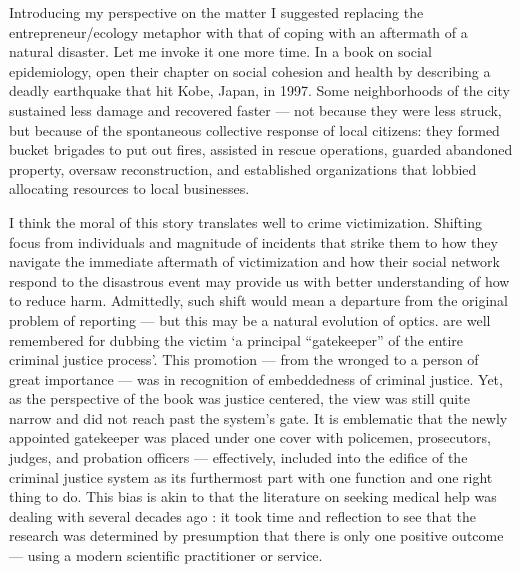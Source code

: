 \documentclass[]{interact}
\theoremstyle{plain}%
\theoremstyle{definition}
\theoremstyle{remark}
\newcommand\citep{\parencite}
\newcommand\citet{\textcite}
\begin{document}
	Introducing my perspective on the matter I suggested replacing the entrepreneur/ecology metaphor with that of coping with an aftermath of a natural disaster. 
	Let me invoke it one more time. In a book on social epidemiology, \citet{kawachi2014social} open their chapter on social cohesion and health by describing a deadly earthquake that hit Kobe, Japan, in 1997. Some neighborhoods of the city sustained less damage and recovered faster --- not because they were less struck, but because of the spontaneous collective response of local citizens: they formed bucket brigades to put out fires, assisted in rescue operations, guarded abandoned property, oversaw reconstruction, and established organizations that lobbied allocating resources to local businesses. 
	
	I think the moral of this story translates well to crime victimization. Shifting focus from individuals and magnitude of incidents that strike them to how they navigate the immediate aftermath of victimization and how their social network respond to the disastrous event may provide us with better understanding of how to reduce harm. Admittedly, such shift would mean a departure from the original problem of reporting --- but this may be a natural evolution of optics. \citet{gottfredson1987decision} are well remembered for dubbing the victim `a principal ``gatekeeper'' of the entire criminal justice process'. This promotion --- from the wronged to a person of great importance --- was in recognition of embeddedness of criminal justice. Yet, as the perspective of the book was justice centered, the view was still quite narrow and did not reach past the system's gate. It is emblematic that the newly appointed gatekeeper was placed under one cover with policemen, prosecutors, judges, and probation officers --- effectively, included into the edifice of the criminal justice system as its furthermost part with one function and one right thing to do. This bias is akin to that the literature on seeking medical help was dealing with several decades ago \citep{pescosolido1992beyond}: it took time and reflection to see that the research was determined by presumption that there is only one positive outcome --- using a modern scientific practitioner or service. 
	
\end{document}
